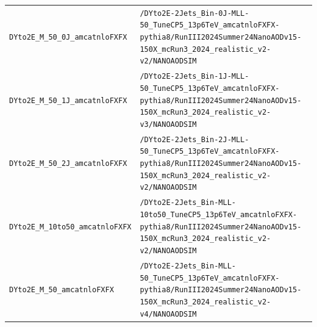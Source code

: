 \begin{longtable}{@{}>{\RaggedRight\arraybackslash}p{} >{\RaggedRight\arraybackslash}p{}@{}}
\addlinespace[2pt]
\texttt{DYto2E\_\allowbreak{}M\_\allowbreak{}50\_\allowbreak{}0J\_\allowbreak{}amcatnloFXFX} & \texttt{/\allowbreak{}DYto2E-\allowbreak{}2Jets\_\allowbreak{}Bin-\allowbreak{}0J-\allowbreak{}MLL-\allowbreak{}50\_\allowbreak{}TuneCP5\_\allowbreak{}13p6TeV\_\allowbreak{}amcatnloFXFX-\allowbreak{}pythia8/\allowbreak{}RunIII2024Summer24NanoAODv15-\allowbreak{}150X\_\allowbreak{}mcRun3\_\allowbreak{}2024\_\allowbreak{}realistic\_\allowbreak{}v2-\allowbreak{}v2/\allowbreak{}NANOAODSIM} \\
\addlinespace[2pt]
\texttt{DYto2E\_\allowbreak{}M\_\allowbreak{}50\_\allowbreak{}1J\_\allowbreak{}amcatnloFXFX} & \texttt{/\allowbreak{}DYto2E-\allowbreak{}2Jets\_\allowbreak{}Bin-\allowbreak{}1J-\allowbreak{}MLL-\allowbreak{}50\_\allowbreak{}TuneCP5\_\allowbreak{}13p6TeV\_\allowbreak{}amcatnloFXFX-\allowbreak{}pythia8/\allowbreak{}RunIII2024Summer24NanoAODv15-\allowbreak{}150X\_\allowbreak{}mcRun3\_\allowbreak{}2024\_\allowbreak{}realistic\_\allowbreak{}v2-\allowbreak{}v3/\allowbreak{}NANOAODSIM} \\
\addlinespace[2pt]
\texttt{DYto2E\_\allowbreak{}M\_\allowbreak{}50\_\allowbreak{}2J\_\allowbreak{}amcatnloFXFX} & \texttt{/\allowbreak{}DYto2E-\allowbreak{}2Jets\_\allowbreak{}Bin-\allowbreak{}2J-\allowbreak{}MLL-\allowbreak{}50\_\allowbreak{}TuneCP5\_\allowbreak{}13p6TeV\_\allowbreak{}amcatnloFXFX-\allowbreak{}pythia8/\allowbreak{}RunIII2024Summer24NanoAODv15-\allowbreak{}150X\_\allowbreak{}mcRun3\_\allowbreak{}2024\_\allowbreak{}realistic\_\allowbreak{}v2-\allowbreak{}v2/\allowbreak{}NANOAODSIM} \\
\addlinespace[2pt]
\texttt{DYto2E\_\allowbreak{}M\_\allowbreak{}10to50\_\allowbreak{}amcatnloFXFX} & \texttt{/\allowbreak{}DYto2E-\allowbreak{}2Jets\_\allowbreak{}Bin-\allowbreak{}MLL-\allowbreak{}10to50\_\allowbreak{}TuneCP5\_\allowbreak{}13p6TeV\_\allowbreak{}amcatnloFXFX-\allowbreak{}pythia8/\allowbreak{}RunIII2024Summer24NanoAODv15-\allowbreak{}150X\_\allowbreak{}mcRun3\_\allowbreak{}2024\_\allowbreak{}realistic\_\allowbreak{}v2-\allowbreak{}v2/\allowbreak{}NANOAODSIM} \\
\addlinespace[2pt]
\texttt{DYto2E\_\allowbreak{}M\_\allowbreak{}50\_\allowbreak{}amcatnloFXFX} & \texttt{/\allowbreak{}DYto2E-\allowbreak{}2Jets\_\allowbreak{}Bin-\allowbreak{}MLL-\allowbreak{}50\_\allowbreak{}TuneCP5\_\allowbreak{}13p6TeV\_\allowbreak{}amcatnloFXFX-\allowbreak{}pythia8/\allowbreak{}RunIII2024Summer24NanoAODv15-\allowbreak{}150X\_\allowbreak{}mcRun3\_\allowbreak{}2024\_\allowbreak{}realistic\_\allowbreak{}v2-\allowbreak{}v4/\allowbreak{}NANOAODSIM} \\

\end{longtable}
